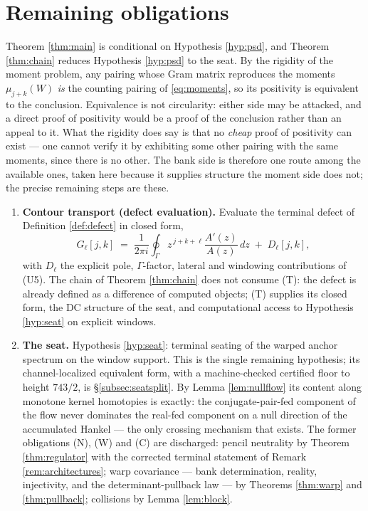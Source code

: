\documentclass[11pt]{article}
\theoremstyle{plain}
\theoremstyle{definition}
\theoremstyle{remark}
\begin{document}
\section{Remaining obligations}\label{sec:obligations}

Theorem \ref{thm:main} is conditional on Hypothesis \ref{hyp:psd}, and Theorem
\ref{thm:chain} reduces Hypothesis \ref{hyp:psd} to the seat. By the rigidity of the
moment problem, any pairing whose Gram matrix reproduces the moments $\mu_{j+k}(W)$
\emph{is} the counting pairing of \eqref{eq:moments}, so its positivity is equivalent to
the conclusion. Equivalence is not circularity: either side may be attacked, and a
direct proof of positivity would be a proof of the conclusion rather than an appeal to
it. What the rigidity does say is that no \emph{cheap} proof of positivity can exist ---
one cannot verify it by exhibiting some other pairing with the same moments, since there
is no other. The bank side is therefore one route among the available ones, taken here
because it supplies structure the moment side does not; the precise remaining steps are
these.

\begin{enumerate}
\item[(T)] \textbf{Contour transport (defect evaluation).} Evaluate the terminal defect
of Definition \ref{def:defect} in closed form,
\[
  G_\ell[j,k] \;=\; \frac{1}{2\pi i}\oint_\Gamma z^{\,j+k+\ell}\frac{A'(z)}{A(z)}\,dz
  \;+\; D_\ell[j,k],
\]
with $D_\ell$ the explicit pole, $\Gamma$-factor, lateral and windowing contributions of
(U5). The chain of Theorem \ref{thm:chain} does not consume (T): the defect is already
defined as a difference of computed objects; (T) supplies its closed form, the DC
structure of the seat, and computational access to Hypothesis \ref{hyp:seat} on explicit
windows.
\item[(S)] \textbf{The seat.} Hypothesis \ref{hyp:seat}: terminal seating of the warped
anchor spectrum on the window support. This is the single remaining hypothesis; its
channel-localized equivalent form, with a machine-checked certified floor to height
$743/2$, is \S\ref{subsec:seatsplit}. By
Lemma \ref{lem:nullflow} its content along monotone kernel homotopies is exactly: the
conjugate-pair-fed component of the flow never dominates the real-fed component on a
null direction of the accumulated Hankel --- the only crossing mechanism that exists. The
former obligations (N), (W) and (C) are discharged: pencil neutrality by Theorem
\ref{thm:regulator} with the corrected terminal statement of Remark
\ref{rem:architectures}; warp covariance --- bank determination, reality, injectivity,
and the determinant-pullback law --- by Theorems \ref{thm:warp} and \ref{thm:pullback};
collisions by Lemma \ref{lem:block}.
\end{enumerate}
\end{document}
